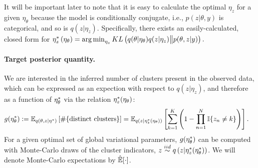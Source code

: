 It will be important later to note that it is easy to calculate the optimal
$\eta_z$ for a given $\eta_\theta$ because the model is conditionally conjugate,
i.e., $p\left(z \vert \theta, y\right)$ is categorical, and so is $q\left(z
\vert \eta_z\right)$.  Specifically, there exists an easily-calculated, closed
form for
%
$
\eta_z^{*}\left(\eta_\theta\right) = \operatorname*{arg\,min}_{\eta_z}
    KL\left(
    q(\theta \vert \eta_\theta) q( z \vert \eta_z)
        \big\| p(\theta, z | y)
    \right).
$
%



\paragraph{Target posterior quantity.}

We are interested in the inferred number of clusters present in the observed
data, which can be expressed as an expection with respect to
$q\left(z \vert \eta_z \right)$, and therefore as a function of
$\eta_\theta^{*}$ via the relation $\eta_z^{*}(\eta_\theta)$:
%
\begin{align}
g(\eta_\theta^{*}) &:=
\mathbb{E}_{q(\theta, z \vert \eta^{*})} \left[ \#\{\text{distinct clusters}\} \right]  =
\mathbb{E}_{q(z \vert \eta_z^{*}(\eta_\theta))} \left[
    \sum_{k=1}^K \left(1 - \prod_{n=1}^N \mathbb{I}\{z_n \ne k\} \right) \right].
    \label{eq:expected_num_clusters}
\end{align}
%
For a given optimal set of global variational parameters, $g(\eta_\theta^{*})$ can
be computed with Monte-Carlo draws of the cluster indicators, $z \stackrel{iid}{\sim} q\left(z
\vert \eta_z^{*}(\eta_\theta^{*})\right)$.  We will denote Monte-Carlo expectations
by $\hat{\mathbb{E}}[\cdot]$.
